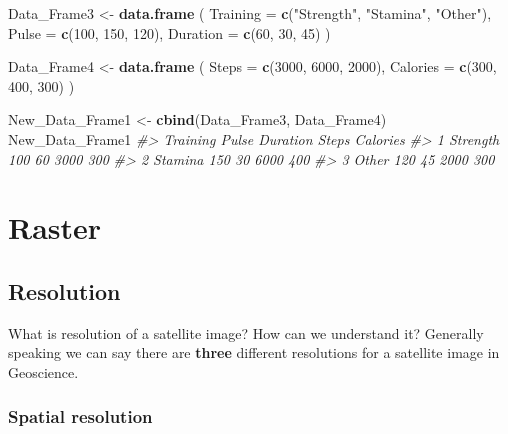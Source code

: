 \documentclass[
]{book}
\newenvironment{Shaded}{\begin{snugshade}}{\end{snugshade}}
\newcommand{\AttributeTok}[1]{\textcolor[rgb]{0.13,0.29,0.53}{#1}}
\newcommand{\CommentTok}[1]{\textcolor[rgb]{0.56,0.35,0.01}{\textit{#1}}}
\newcommand{\DecValTok}[1]{\textcolor[rgb]{0.00,0.00,0.81}{#1}}
\newcommand{\FunctionTok}[1]{\textcolor[rgb]{0.13,0.29,0.53}{\textbf{#1}}}
\newcommand{\NormalTok}[1]{#1}
\newcommand{\OtherTok}[1]{\textcolor[rgb]{0.56,0.35,0.01}{#1}}
\newcommand{\StringTok}[1]{\textcolor[rgb]{0.31,0.60,0.02}{#1}}
\begin{document}
\begin{Shaded}
\begin{Highlighting}[]
\NormalTok{Data\_Frame3 }\OtherTok{\textless{}{-}} \FunctionTok{data.frame}\NormalTok{ (}
  \AttributeTok{Training =} \FunctionTok{c}\NormalTok{(}\StringTok{"Strength"}\NormalTok{, }\StringTok{"Stamina"}\NormalTok{, }\StringTok{"Other"}\NormalTok{),}
  \AttributeTok{Pulse =} \FunctionTok{c}\NormalTok{(}\DecValTok{100}\NormalTok{, }\DecValTok{150}\NormalTok{, }\DecValTok{120}\NormalTok{),}
  \AttributeTok{Duration =} \FunctionTok{c}\NormalTok{(}\DecValTok{60}\NormalTok{, }\DecValTok{30}\NormalTok{, }\DecValTok{45}\NormalTok{)}
\NormalTok{)}

\NormalTok{Data\_Frame4 }\OtherTok{\textless{}{-}} \FunctionTok{data.frame}\NormalTok{ (}
  \AttributeTok{Steps =} \FunctionTok{c}\NormalTok{(}\DecValTok{3000}\NormalTok{, }\DecValTok{6000}\NormalTok{, }\DecValTok{2000}\NormalTok{),}
  \AttributeTok{Calories =} \FunctionTok{c}\NormalTok{(}\DecValTok{300}\NormalTok{, }\DecValTok{400}\NormalTok{, }\DecValTok{300}\NormalTok{)}
\NormalTok{)}

\NormalTok{New\_Data\_Frame1 }\OtherTok{\textless{}{-}} \FunctionTok{cbind}\NormalTok{(Data\_Frame3, Data\_Frame4)}
\NormalTok{New\_Data\_Frame1}
\CommentTok{\#\textgreater{}   Training Pulse Duration Steps Calories}
\CommentTok{\#\textgreater{} 1 Strength   100       60  3000      300}
\CommentTok{\#\textgreater{} 2  Stamina   150       30  6000      400}
\CommentTok{\#\textgreater{} 3    Other   120       45  2000      300}
\end{Highlighting}
\end{Shaded}

\hypertarget{raster}{%
\chapter{Raster}\label{raster}}

\hypertarget{resolution}{%
\section{Resolution}\label{resolution}}

What is resolution of a satellite image? How can we understand it? Generally speaking we can say there are \textbf{three} different resolutions for a satellite image in Geoscience.\\

\hypertarget{spatial-resolution}{%
\subsection{\texorpdfstring{\textbf{Spatial resolution}}{Spatial resolution}}\label{spatial-resolution}}
\end{document}
